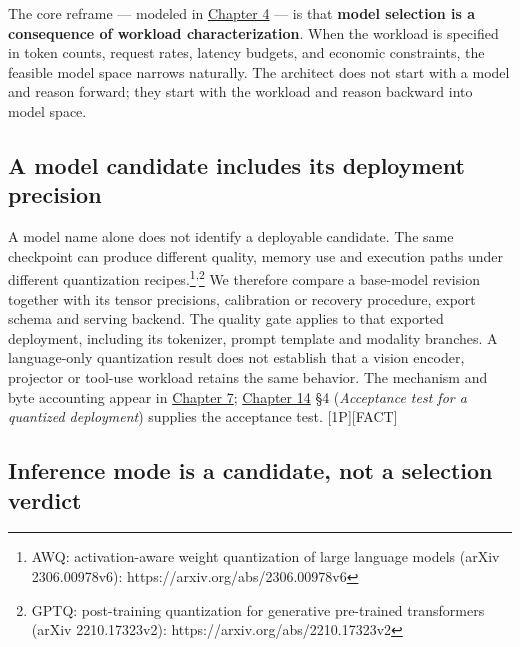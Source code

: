 The core reframe --- modeled in \hyperref[chap:4]{Chapter 4} --- is that \textbf{model
selection is a consequence of workload characterization}. When the
workload is specified in token counts, request rates, latency budgets,
and economic constraints, the feasible model space narrows naturally.
The architect does not start with a model and reason forward; they start
with the workload and reason backward into model space.

\subsection{A model candidate includes its deployment
precision}\label{a-model-candidate-includes-its-deployment-precision}

A model name alone does not identify a deployable candidate. The same
checkpoint can produce different quality, memory use and execution paths
under different quantization
recipes.\footnote{AWQ: activation-aware weight quantization of large
  language models (arXiv 2306.00978v6):
  https://arxiv.org/abs/2306.00978v6}\textsuperscript{,}\footnote{GPTQ:
  post-training quantization for generative pre-trained transformers
  (arXiv 2210.17323v2): https://arxiv.org/abs/2210.17323v2} We therefore
compare a base-model revision together with its tensor precisions,
calibration or recovery procedure, export schema and serving backend.
The quality gate applies to that exported deployment, including its
tokenizer, prompt template and modality branches. A language-only
quantization result does not establish that a vision encoder, projector
or tool-use workload retains the same behavior. The mechanism and byte
accounting appear in \hyperref[chap:7]{Chapter 7}; \hyperref[chap:14]{Chapter 14} §4 (\emph{Acceptance test for
a quantized deployment}) supplies the acceptance test.
\mbox{{[}1P{]}}\hspace{0pt}\mbox{{[}FACT{]}}

\subsection{Inference mode is a candidate, not a selection
verdict}\label{inference-mode-is-a-candidate-not-a-selection-verdict}

